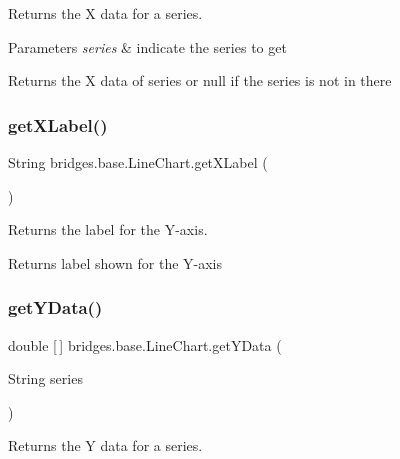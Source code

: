 Returns the X data for a series. 


\begin{DoxyParams}{Parameters}
{\em series} & indicate the series to get \\
\hline
\end{DoxyParams}
\begin{DoxyReturn}{Returns}
the X data of series or null if the series is not in there 
\end{DoxyReturn}
\mbox{\label{classbridges_1_1base_1_1_line_chart_a0885f5c62f950d96397b1704da6e2798}} 
\subsubsection{\texorpdfstring{get\+X\+Label()}{getXLabel()}}
{\footnotesize\ttfamily String bridges.\+base.\+Line\+Chart.\+get\+X\+Label (\begin{DoxyParamCaption}{ }\end{DoxyParamCaption})}



Returns the label for the Y-\/axis. 

\begin{DoxyReturn}{Returns}
label shown for the Y-\/axis 
\end{DoxyReturn}
\mbox{\label{classbridges_1_1base_1_1_line_chart_a2bf257f45c1056808b41581af1f83645}} 
\subsubsection{\texorpdfstring{get\+Y\+Data()}{getYData()}}
{\footnotesize\ttfamily double \mbox{[}$\,$\mbox{]} bridges.\+base.\+Line\+Chart.\+get\+Y\+Data (\begin{DoxyParamCaption}\item[{String}]{series }\end{DoxyParamCaption})}



Returns the Y data for a series. 



